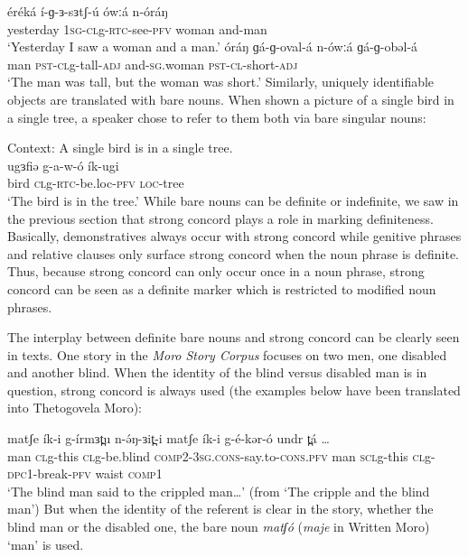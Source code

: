 \ea 
	\ea \gll	éréká	í-ɡ-ɜ-sɜtʃ-ú		ówːá		n-óráŋ \\
		yesterday 	1\textsc{sg}-\textsc{cl}g-\textsc{rtc}-see-\textsc{pfv} 	woman 	and-man\\
		\glt	‘Yesterday I saw a woman and a man.’ \label{indefbaren}
	\ex \gll	óráŋ 	ɡá-ɡ-oval-á	n-ówːá		ɡá-ɡ-obəl-á\\
		man 	\textsc{pst}-\textsc{cl}g-tall-\textsc{adj}	and-\textsc{sg}.woman 	\textsc{pst}-\textsc{cl}-short-\textsc{adj}\\
		\glt ‘The man was tall, but the woman was short.’ \hfill %
	\z
\z 
Similarly, uniquely identifiable objects are translated with bare nouns. When shown a picture of a single bird in a single tree, a speaker chose to refer to them both via bare singular nouns: 

\ea Context: A single bird is in a single tree.\\
	\gll  ugɜfiə g-a-w-ó ík-ugi		\\
		   bird  \textsc{cl}g-\textsc{rtc}-be.loc-\textsc{pfv} \textsc{loc}-tree\\
	\glt ‘The bird is in the tree.’  \hfill %
\z 
While bare nouns can be definite or indefinite, we saw in the previous section that strong concord plays a role in marking definiteness. Basically, demonstratives always occur with strong concord while genitive phrases and relative clauses only surface strong concord when the noun phrase is definite. Thus, because strong concord can only occur once in a noun phrase, strong concord can be seen as a definite marker which is restricted to modified noun phrases.

The interplay between definite bare nouns and strong concord can be clearly seen in texts. One story in the \textit{Moro Story Corpus} focuses on two men, one disabled and another blind. When the identity of the blind versus disabled man is in question, strong concord is always used (the examples below have been translated into Thetogovela Moro):

\ea \gll matʃe ík-i g-írmɜt̪u n-ə́ŋ-ɜit̪-i matʃe ík-i g-é-kər-ó undr t̪á {\ldots}\\
	man \textsc{cl}g-this \textsc{cl}g-be.blind \textsc{comp}2-3\textsc{sg}.\textsc{cons}-say.to-\textsc{cons}.\textsc{pfv} man \textsc{scl}g-this \textsc{cl}g-\textsc{dpc}1-break-\textsc{pfv} waist \textsc{comp}1 {} \\
	\glt	`The blind man said to the crippled man\ldots' \hfill (from `The cripple and the blind man')
\z 
But when the identity of the referent is clear in the story, whether the blind man or the disabled one, the bare noun \textit{matʃó} (\textit{maje} in Written Moro) `man' is used.

